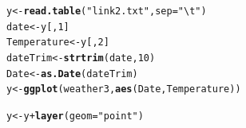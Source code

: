 \documentclass{article}\usepackage{graphicx, color}
\makeatletter
\newcommand{\hlfunctioncall}[1]{\textcolor[rgb]{0.501960784313725,0,0.329411764705882}{\textbf{#1}}}%
\newcommand{\hlstring}[1]{\textcolor[rgb]{0.6,0.6,1}{#1}}%
\newenvironment{kframe}{%
 \def\at@end@of@kframe{}%
 \ifinner\ifhmode%
  \def\at@end@of@kframe{\end{minipage}}%
  \begin{minipage}{\columnwidth}%
 \fi\fi%
 \def\FrameCommand##1{\hskip\@totalleftmargin \hskip-\fboxsep
 \colorbox{shadecolor}{##1}\hskip-\fboxsep
     \hskip-\linewidth \hskip-\@totalleftmargin \hskip\columnwidth}%
 \MakeFramed {\advance\hsize-\width
   \@totalleftmargin\z@ \linewidth\hsize
   \@setminipage}}%
 {\par\unskip\endMakeFramed%
 \at@end@of@kframe}
\newenvironment{knitrout}{}{} %
\makeatother
\begin{document}
\begin{knitrout}
\color{fgcolor}\begin{kframe}
\begin{alltt}
y <- \hlfunctioncall{read.table}(\hlstring{"link2.txt"}, sep = \hlstring{"\textbackslash{}t"})
date <- y[, 1]
Temperature <- y[, 2]
dateTrim <- \hlfunctioncall{strtrim}(date, 10)
Date <- \hlfunctioncall{as.Date}(dateTrim)
y <- \hlfunctioncall{ggplot}(weather3, \hlfunctioncall{aes}(Date, Temperature))
\end{alltt}


{\ttfamily\noindent\bfseries\color{errorcolor}{\#\# Error: object 'weather3' not found}}\begin{alltt}
y <- y + \hlfunctioncall{layer}(geom = \hlstring{"point"})
\end{alltt}



\end{kframe}
\end{knitrout}
\end{document}
